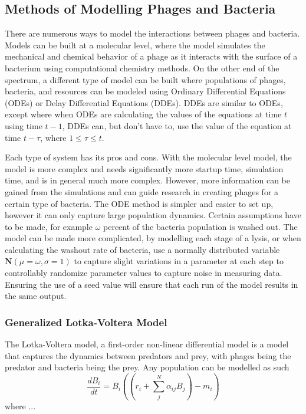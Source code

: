 \subsection{Methods of Modelling Phages and Bacteria}
There are numerous ways to model the interactions between phages and bacteria. Models can be built at a molecular level, where the model simulates the mechanical and chemical behavior of a phage as it interacts with the surface of a bacterium using computational chemistry methods. On the other end of the spectrum, a different type of model can be built where populations of phages, bacteria, and resources can be modeled using Ordinary Differential Equations (ODEs) or Delay Differential Equations (DDEs). DDEs are similar to ODEs, except where when ODEs are calculating the values of the equations at time $t$ using time $t-1$, DDEs can, but don't have to, use the value of the equation at time $t-\tau$, where $1 \leq \tau \leq t$. \newline 

Each type of system has its pros and cons. With the molecular level model, the model is more complex and needs significantly more startup time, simulation time, and is in general much more complex. However, more information can be gained from the simulations and can guide research in creating phages for a certain type of bacteria. The ODE method is simpler and easier to set up, however it can only capture large population dynamics. Certain assumptions have to be made, for example $\omega$ percent of the bacteria population is washed out. The model can be made more complicated, by modelling each stage of a lysis, or when calculating the washout rate of bacteria, use a normally distributed variable $\textbf{N}(\mu=\omega, \sigma=1)$ to capture slight variations in a parameter at each step to controllably randomize parameter values to capture noise in measuring data. Ensuring the use of a seed value will ensure that each run of the model results in the same output. 

\subsubsection{Generalized Lotka-Voltera Model}
The Lotka-Voltera model, a first-order non-linear differential model is a model that captures the dynamics between predators and prey, with phages being the predator and bacteria being the prey. Any population can be modelled as such
\[ 
    \frac{d{B}_i}{dt} = {B}_i \left(\left(r_i + \sum_{j}^{N} \alpha_{ij}{B}_j \right) - m_i\right)
\]
where ... 

